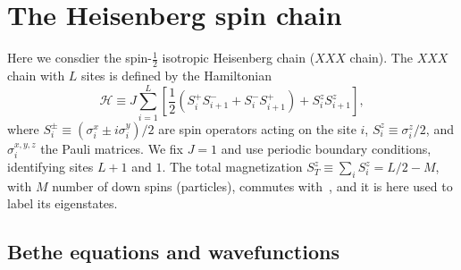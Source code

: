 \documentclass[11pt]{iopart}
\begin{document}
\section{The Heisenberg spin chain}
\label{xxx-chain}

Here we consdier the spin-$\frac{1}{2}$ isotropic Heisenberg chain ($XXX$ chain). 
The $XXX$ chain with $L$ sites is defined by the Hamiltonian 
%
\begin{equation}
\label{xxx-ham}
{\mathcal H}\equiv J\sum\limits_{i=1}^L\left[\frac{1}{2}(S_i^+S^-_{i+1} 
+S_i^{-}S_{i+1}^+)+S_i^zS_{i+1}^z\right],  
\end{equation}
%
where $S^{\pm}_i\equiv (\sigma_i^x\pm i\sigma_i^y)/2$ are spin operators acting on the 
site $i$, $S_i^z\equiv\sigma_i^z/2$, and $\sigma^{x,y,z}_i$ the Pauli matrices. We fix 
$J=1$ and use periodic boundary conditions, identifying sites $L+1$ and $1$. The total 
magnetization $S_{T}^z\equiv\sum_iS_i^z=L/2-M$, with $M$ number of down spins (particles), 
commutes with~, and it is here used to label its eigenstates. 


\subsection{Bethe equations and wavefunctions}
\label{bethe_equations}
\end{document}
